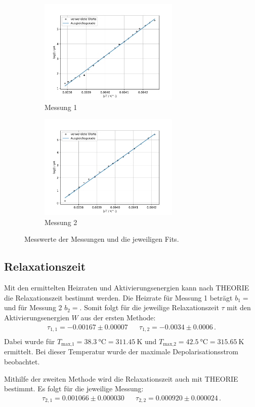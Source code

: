  \begin{figure}
    \begin{subfigure}[b]{.5\linewidth}
      \centering
      \includegraphics[height=5cm, keepaspectratio]{build_j/log(int)_2durchT_1.pdf}
      \caption{Messung 1}
    \end{subfigure}
    \begin{subfigure}[b]{.5\linewidth}
      \centering
      \includegraphics[height=5cm, keepaspectratio]{build_j/log(int)_2durchT_2.pdf}
      \caption{Messung 2}
    \end{subfigure}
    \caption{Messwerte der Messungen und die jeweiligen Fits.}
    \label{fig:Trapez}
  \end{figure} %

\subsection{Relaxationszeit}
  Mit den ermittelten Heizraten und Aktivierungsenergien kann nach THEORIE die Relaxationszeit bestimmt werden.
  Die Heizrate für Messung 1 beträgt $b_1 = $ und für Messung 2 $b_2 = $.
  Somit folgt für die jeweilige Relaxationszeit $\tau$ mit den Aktivierungsenergien $W$ aus der ersten Methode:
  \begin{align*}
    \tau_{1,1} = -0.00167 \pm 0.00007 &&  \tau_{1,2} = -0.0034 \pm 0.0006 \, . \\
  \end{align*}
  Dabei wurde für $T_\text{max,1} = \SI{38.3}{\celsius} = \SI{311.45}{\kelvin} $ und $T_\text{max,2} = \SI{42.5}{\celsius} = \SI{315.65}{\kelvin}$ ermittelt.
  Bei dieser Temperatur wurde der maximale Depolarisationsstrom beobachtet.

  \noindent
  Mithilfe der zweiten Methode wird die Relaxationszeit auch mit THEORIE bestimmt.
  Es folgt für die jeweilige Messung:
  \begin{align*}
    \tau_{2,1} =  0.001066 \pm 0.000030 &&  \tau_{2,2} = 0.000920 \pm 0.000024\, . \\
  \end{align*}
